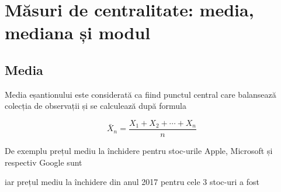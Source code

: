 \documentclass[]{article}
\newenvironment{Shaded}{\begin{snugshade}}{\end{snugshade}}
\newcommand{\KeywordTok}[1]{\textcolor[rgb]{0.13,0.29,0.53}{\textbf{#1}}}
\newcommand{\DecValTok}[1]{\textcolor[rgb]{0.00,0.00,0.81}{#1}}
\newcommand{\FloatTok}[1]{\textcolor[rgb]{0.00,0.00,0.81}{#1}}
\newcommand{\StringTok}[1]{\textcolor[rgb]{0.31,0.60,0.02}{#1}}
\newcommand{\OperatorTok}[1]{\textcolor[rgb]{0.81,0.36,0.00}{\textbf{#1}}}
\newcommand{\NormalTok}[1]{#1}
\begin{document}
\section{Măsuri de centralitate: media, mediana și
modul}\label{masuri-de-centralitate-media-mediana-si-modul}

\subsection{Media}\label{media}

Media eșantionului este considerată ca fiind punctul central care
balansează colecția de observații și se calculează după formula

\[
  \bar{X}_n = \frac{X_1+X_2+\cdots +X_n}{n}
\]

De exemplu prețul mediu la închidere pentru stoc-urile Apple, Microsoft
și respectiv Google sunt

\begin{Shaded}
\end{Shaded}

iar prețul mediu la închidere din anul 2017 pentru cele 3 stoc-uri a
fost

\begin{Shaded}
\end{Shaded}
\end{document}
